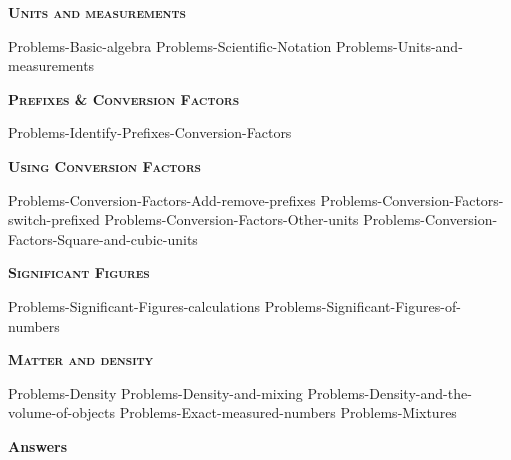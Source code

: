 \documentclass[main.tex]{subfiles}
\begin{document}
\newpage
\setdoublesep{0.35700 em}  %
\setatomsep{1.78500 em}    %
\setbondoffset{0.18265 em} %
\newcommand{\bondwidth}{0.06642 em} %
\setbondstyle{line width = \bondwidth}
\fancyhfoffset[E,O]{0pt}
\setlength{\columnsep}{30pt}
\begin{conclusion}
\end{conclusion}
\begin{multicols*}{2}\setcounter{numA}{1}



{\raggedright\textsc{\textbf{Units and measurements }}\par}
{Problems-Basic-algebra}
{Problems-Scientific-Notation}
{Problems-Units-and-measurements}


{\raggedright\textsc{\textbf{Prefixes \& Conversion Factors }}\par}
{Problems-Identify-Prefixes-Conversion-Factors}




{\raggedright\textsc{\textbf{Using Conversion Factors }}\par}
{Problems-Conversion-Factors-Add-remove-prefixes}
{Problems-Conversion-Factors-switch-prefixed}
{Problems-Conversion-Factors-Other-units}
{Problems-Conversion-Factors-Square-and-cubic-units}
{\raggedright\textsc{\textbf{Significant Figures }}\par}
{Problems-Significant-Figures-calculations}
{Problems-Significant-Figures-of-numbers}
{\raggedright\textsc{\textbf{Matter and density }}\par}
{Problems-Density}
{Problems-Density-and-mixing}
{Problems-Density-and-the-volume-of-objects}
{Problems-Exact-measured-numbers}
{Problems-Mixtures}













\end{multicols*}

\newpage
\begin{answersenvironment}
\begin{minipage}[c]{1\textwidth}
\begin{localsize}{10}
{\Large \bf Answers}
\printsolutions 
\end{localsize}
\end{minipage}\end{answersenvironment}
\end{document}
